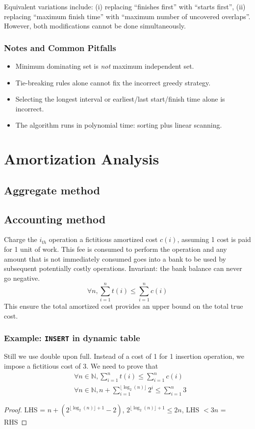 \documentclass[9pt]{extarticle}
\begin{document}
Equivalent variations include:
(i) replacing ``finishes first'' with ``starts first'',
(ii) replacing ``maximum finish time'' with ``maximum number of uncovered overlaps''.
However, both modifications cannot be done simultaneously.

\subsubsection*{Notes and Common Pitfalls}
\begin{itemize}
    \item Minimum dominating set is \emph{not} maximum independent set.
    \item Tie-breaking rules alone cannot fix the incorrect greedy strategy.
    \item Selecting the longest interval or earliest/last start/finish time alone is incorrect.
    \item The algorithm runs in polynomial time: sorting plus linear scanning.
\end{itemize}



\newpage
\section{Amortization Analysis}
\subsection{Aggregate method}
\subsection{Accounting method}
Charge the $i_{th}$ operation a fictitious amortized cost $c(i)$, assuming 1 cost is paid for 1 unit of work. This fee is consumed to perform
the operation and any amount that is not immediately consumed goes into a bank to be used by subsequent potentially costly operations. Invariant: the bank
balance can never go negative.
\[\forall n, \sum_{i=1}^{n} t(i) \leq \sum_{i=1}^{n} c(i)\]
This ensure the total amortized cost provides an upper bound on the total true cost.
\subsubsection*{Example: \texttt{INSERT} in dynamic table}
Still we use double upon full. Instead of a cost of 1 for 1 insertion operation, we impose a fictitious cost of 3. We need to prove that 
\begin{align*}
  &\forall n\in \mathbb{N}, \sum_{i=1}^{n} t(i) \leq \sum_{i=1}^{n} c(i)\\
  &\forall n \in \mathbb{N}, n + \sum_{i=1}^{\lfloor \log_2(n)\rfloor} 2^i \leq \sum_{i=1}^{n} 3  
\end{align*}
\begin{proof}
LHS = $n + (2^{\lfloor \log_2(n)\rfloor + 1} - 2)$, $2^{\lfloor \log_2(n)\rfloor + 1} \leq 2n$, LHS $< 3n$ = RHS
\end{proof}
\end{document}
